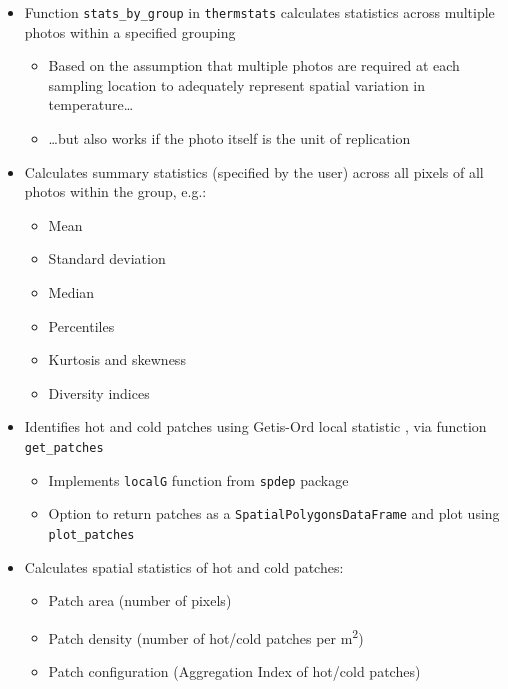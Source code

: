 \documentclass[12pt,a4paper,]{report}
\providecommand{\tightlist}{%
  \setlength{\itemsep}{0pt}\setlength{\parskip}{0pt}}
\theoremstyle{definition}
\theoremstyle{definition}
\theoremstyle{definition}
\theoremstyle{remark}
\begin{document}
\begin{itemize}
\tightlist
\item
  Function \texttt{stats\_by\_group} in \texttt{thermstats} calculates
  statistics across multiple photos within a specified grouping

  \begin{itemize}
  \tightlist
  \item
    Based on the assumption that multiple photos are required at each
    sampling location to adequately represent spatial variation in
    temperature\ldots{}
  \item
    \ldots{}but also works if the photo itself is the unit of
    replication
  \end{itemize}
\item
  Calculates summary statistics (specified by the user) across all
  pixels of all photos within the group, e.g.:

  \begin{itemize}
  \tightlist
  \item
    Mean
  \item
    Standard deviation
  \item
    Median
  \item
    Percentiles
  \item
    Kurtosis and skewness
  \item
    Diversity indices
  \end{itemize}
\item
  Identifies hot and cold patches using Getis-Ord local statistic
  \citep{getis_local_1996}, via function \texttt{get\_patches}

  \begin{itemize}
  \tightlist
  \item
    Implements \texttt{localG} function from \texttt{spdep} package
  \item
    Option to return patches as a \texttt{SpatialPolygonsDataFrame} and
    plot using \texttt{plot\_patches}
  \end{itemize}
\item
  Calculates spatial statistics of hot and cold patches:

  \begin{itemize}
  \tightlist
  \item
    Patch area (number of pixels)
  \item
    Patch density (number of hot/cold patches per m\textsuperscript{2})
  \item
    Patch configuration (Aggregation Index of hot/cold patches)
  \end{itemize}
\end{itemize}
\end{document}
